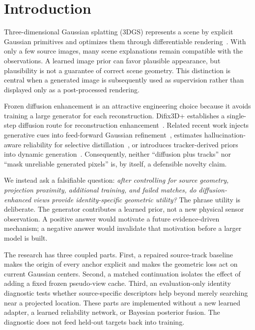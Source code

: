 \documentclass[10pt,twocolumn,letterpaper]{article}
\begin{document}
\section{Introduction}
Three-dimensional Gaussian splatting (3DGS) represents a scene by explicit Gaussian primitives and optimizes them through differentiable rendering~\citep{kerbl2023gaussians}. With only a few source images, many scene explanations remain compatible with the observations. A learned image prior can favor plausible appearance, but plausibility is not a guarantee of correct scene geometry. This distinction is central when a generated image is subsequently used as supervision rather than displayed only as a post-processed rendering.

Frozen diffusion enhancement is an attractive engineering choice because it avoids training a large generator for each reconstruction. Difix3D+ establishes a single-step diffusion route for reconstruction enhancement~\citep{wu2025difix}. Related recent work injects generative cues into feed-forward Gaussian refinement~\citep{chen2026gifsplat}, estimates hallucination-aware reliability for selective distillation~\citep{liu2026had}, or introduces tracker-derived priors into dynamic generation~\citep{sun2025track4dgen}. Consequently, neither ``diffusion plus tracks'' nor ``mask unreliable generated pixels'' is, by itself, a defensible novelty claim.

We instead ask a falsifiable question: \emph{after controlling for source geometry, projection proximity, additional training, and failed matches, do diffusion-enhanced views provide identity-specific geometric utility?} The phrase utility is deliberate. The generator contributes a learned prior, not a new physical sensor observation. A positive answer would motivate a future evidence-driven mechanism; a negative answer would invalidate that motivation before a larger model is built.

The research has three coupled parts. First, a repaired source-track baseline makes the origin of every anchor explicit and makes the geometric loss act on current Gaussian centers. Second, a matched continuation isolates the effect of adding a fixed frozen pseudo-view cache. Third, an evaluation-only identity diagnostic tests whether source-specific descriptors help beyond merely searching near a projected location. These parts are implemented without a new learned adapter, a learned reliability network, or Bayesian posterior fusion. The diagnostic does not feed held-out targets back into training.
\end{document}
